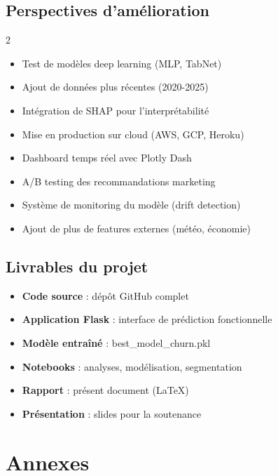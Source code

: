 \documentclass[11pt,a4paper]{article}
\begin{document}
\subsection{Perspectives d'amélioration}
\begin{multicols}{2}
\begin{itemize}
    \item Test de modèles deep learning (MLP, TabNet)
    \item Ajout de données plus récentes (2020-2025)
    \item Intégration de SHAP pour l'interprétabilité
    \item Mise en production sur cloud (AWS, GCP, Heroku)
    \item Dashboard temps réel avec Plotly Dash
    \item A/B testing des recommandations marketing
    \item Système de monitoring du modèle (drift detection)
    \item Ajout de plus de features externes (météo, économie)
\end{itemize}
\end{multicols}

\subsection{Livrables du projet}
\begin{itemize}
    \item \textbf{Code source} : dépôt GitHub complet
    \item \textbf{Application Flask} : interface de prédiction fonctionnelle
    \item \textbf{Modèle entraîné} : best\_model\_churn.pkl
    \item \textbf{Notebooks} : analyses, modélisation, segmentation
    \item \textbf{Rapport} : présent document (LaTeX)
    \item \textbf{Présentation} : slides pour la soutenance
\end{itemize}

\newpage
\section*{Annexes}
\end{document}
